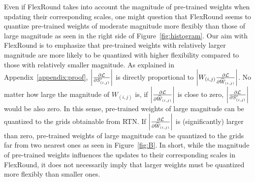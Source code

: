 \documentclass{article}
\theoremstyle{plain}
\theoremstyle{definition}
\theoremstyle{remark}
\begin{document}
Even if FlexRound takes into account the magnitude of pre-trained weights when updating their corresponding scales, one might question that FlexRound seems to quantize pre-trained weights of moderate magnitude more flexibly than those of large magnitude as seen in the right side of Figure~\ref{fig:histogram}. Our aim with FlexRound is to emphasize that pre-trained weights with relatively larger magnitude are more likely to be quantized with higher flexibility compared to those with relatively smaller magnitude. As explained in Appendix~\ref{appendix:proof}, $\left| {{\partial\mathcal{L}} \over {\partial S'_{(i, j)}}} \right|$ is directly proportional to $\left| W_{(i, j)} {{\partial\mathcal{L}} \over {\partial \widehat{W}_{(i, j)}}} \right|$. No matter how large the magnitude of $W_{(i, j)}$ is, if $\left| {{\partial\mathcal{L}} \over {\partial \widehat{W}_{(i, j)}}} \right|$ is close to zero, $\left| {{\partial\mathcal{L}} \over {\partial S'_{(i, j)}}} \right|$ would be also zero. In this sense, pre-trained weights of large magnitude can be quantized to the grids obtainable from RTN. If $\left| {{\partial\mathcal{L}} \over {\partial \widehat{W}_{(i, j)}}} \right|$ is (significantly) larger than zero, pre-trained weights of large magnitude can be quantized to the grids far from two nearest ones as seen in Figure~\ref{fig:B}. In short, while the magnitude of pre-trained weights influences the updates to their corresponding scales in FlexRound, it does not necessarily imply that larger weights must be quantized more flexibly than smaller ones.


\end{document}
